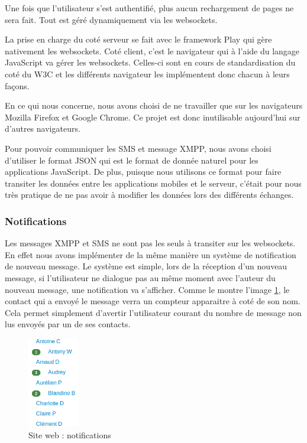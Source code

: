 Une fois que l'utilisateur s'est authentifié, plus aucun rechargement de pages ne sera fait.
Tout est géré 
dynamiquement via les websockets. 

La prise en charge du coté serveur se fait avec le framework Play qui gère nativement les websockets. Coté client,
c'est le navigateur qui à l'aide du langage JavaScript va gérer les websockets. Celles-ci sont en cours de standardisation
du coté du W3C et les différents navigateur les implémentent donc chacun à leurs façons. 

En ce qui nous concerne, nous avons choisi de ne travailler que sur les navigateurs Mozilla Firefox et Google Chrome.
Ce projet est donc inutilisable aujourd'hui sur d'autres navigateurs.

Pour pouvoir communiquer les SMS et message XMPP, nous avons choisi d'utiliser le format JSON qui est le format de
donnée naturel pour les applications JavaScript. De plus, puisque nous utilisons ce format pour faire transiter les
données entre les applications mobiles et le serveur, c'était pour nous très pratique de ne pas avoir à modifier
les données lors des différents échanges.


\subsubsection{Notifications}

Les messages XMPP et SMS ne sont pas les seuls à transiter sur les websockets. En effet nous avons 
implémenter de la même manière un système de notification de nouveau message. Le système est simple,
lors de la réception d'un nouveau message, si l'utilisateur ne dialogue pas au même moment avec l'auteur
du nouveau message, une notification va s'afficher. Comme le montre l'image \ref{siteWeb_notifications}, le contact
qui a envoyé le message verra un compteur apparaitre à coté de son nom. Cela permet simplement d'avertir
l'utilisateur courant du nombre de message non lus envoyés par un de ses contacts.
\begin{figure}[!h]
	\center
	\includegraphics[width=0.2\textwidth]{img/siteWeb_notifications.png}
	\caption{Site web : notifications}
	\label{siteWeb_notifications}
\end{figure}

